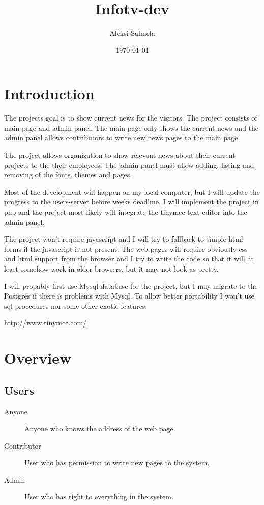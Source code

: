 \documentclass[12pt,a4paper,oneside,draft]{book}
\begin{document}
\title{Infotv-dev}
\author{Aleksi Salmela}
\date{\today}
\maketitle

\tableofcontents

\chapter{Introduction}
The projects goal is to show current news for the visitors. The project consists of main page and admin panel. The main page only shows the current news and the admin panel allows contributors to write new news pages to the main page.

The project allows organization to show relevant news about their current projects to the their employees. The admin panel must allow adding, listing and removing of the fonts, themes and pages.

Most of the development will happen on my local computer, but I will update the progress to the users-server before weeks deadline. I will implement the project in php and the project most likely will integrate the tinymce text editor into the admin panel.

The project won't require javascript and I will try to fallback to simple html forms if the javascript is not present. The web pages will require obviously css and html support from the browser and I try to write the code so that it will at least somehow work in older browsers, but it may not look as pretty.

I will propably first use Mysql database for the project, but I may migrate to the Postgres if there is problems with Mysql. To allow better portability I won't use sql procedures nor some other exotic features.

\url{http://www.tinymce.com/}

\chapter{Overview}
\section{Users}
\begin{description}
  \item[Anyone]      Anyone who knows the address of the web page.
  \item[Contributor] User who has permission to write new pages to the system.
  \item[Admin]       User who has right to everything in the system.
\end{description}
\end{document}

